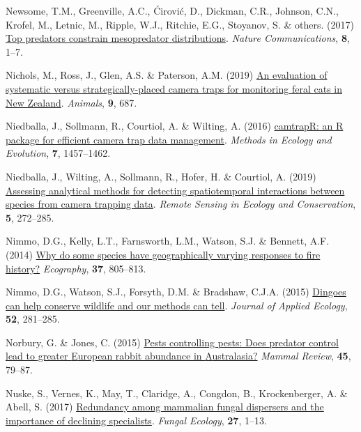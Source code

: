 \documentclass[11pt,a4paper,titlepage,twoside,openright]{style/unimelbthesis}
\newenvironment{CSLReferences}%
  {}%
  {\par}
\begin{document}
\begin{mainmatter}
\begin{CSLReferences}{1}{0}
\leavevmode{}%
Newsome, T.M., Greenville, A.C., Ćirović, D., Dickman, C.R., Johnson, C.N., Krofel, M., Letnic, M., Ripple, W.J., Ritchie, E.G., Stoyanov, S. \& others. (2017) \href{https://doi.org/10.1038/ncomms15469}{Top predators constrain mesopredator distributions}. \emph{Nature Communications}, \textbf{8}, 1--7.

\leavevmode{}%
Nichols, M., Ross, J., Glen, A.S. \& Paterson, A.M. (2019) \href{https://doi.org/10.3390/ani9090687}{An evaluation of systematic versus strategically-placed camera traps for monitoring feral cats in {New Zealand}}. \emph{Animals}, \textbf{9}, 687.

\leavevmode{}%
Niedballa, J., Sollmann, R., Courtiol, A. \& Wilting, A. (2016) \href{https://doi.org/10.1111/2041-210X.12600}{{camtrapR: an R package for efficient camera trap data management}}. \emph{Methods in Ecology and Evolution}, \textbf{7}, 1457--1462.

\leavevmode{}%
Niedballa, J., Wilting, A., Sollmann, R., Hofer, H. \& Courtiol, A. (2019) \href{https://doi.org/10.1002/rse2.107}{Assessing analytical methods for detecting spatiotemporal interactions between species from camera trapping data}. \emph{Remote Sensing in Ecology and Conservation}, \textbf{5}, 272--285.

\leavevmode{}%
Nimmo, D.G., Kelly, L.T., Farnsworth, L.M., Watson, S.J. \& Bennett, A.F. (2014) \href{https://doi.org/10.1111/ecog.00684}{Why do some species have geographically varying responses to fire history?} \emph{Ecography}, \textbf{37}, 805--813.

\leavevmode{}%
Nimmo, D.G., Watson, S.J., Forsyth, D.M. \& Bradshaw, C.J.A. (2015) \href{https://doi.org/10.1111/1365-2664.12369}{Dingoes can help conserve wildlife and our methods can tell}. \emph{Journal of Applied Ecology}, \textbf{52}, 281--285.

\leavevmode{}%
Norbury, G. \& Jones, C. (2015) \href{https://doi.org/10.1111/mam.12034}{Pests controlling pests: Does predator control lead to greater {E}uropean rabbit abundance in {A}ustralasia?} \emph{Mammal Review}, \textbf{45}, 79--87.

\leavevmode{}%
Nuske, S., Vernes, K., May, T., Claridge, A., Congdon, B., Krockenberger, A. \& Abell, S. (2017) \href{https://doi.org/10.1016/j.funeco.2017.02.005}{Redundancy among mammalian fungal dispersers and the importance of declining specialists}. \emph{Fungal Ecology}, \textbf{27}, 1--13.


\end{CSLReferences}
\end{mainmatter}
\end{document}

